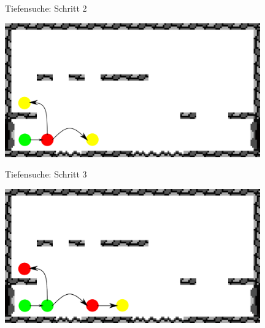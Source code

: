 \documentclass[fleqn]{beamer}
\begin{document}
    \begin{frame}{Tiefensuche: Schritt 2}
    		\begin{center}
    			\includegraphics[width=11cm]{Bilder/dfs2.png}
    		\end{center}
    \end{frame}
    
    \begin{frame}{Tiefensuche: Schritt 3}
    		\begin{center}
    			\includegraphics[width=11cm]{Bilder/dfs3.png}
    		\end{center}
    \end{frame}
    
\end{document}
